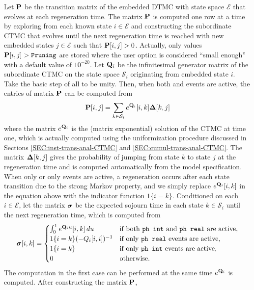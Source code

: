 \begin{private}
Let $\P$ be the transition matrix of the embedded DTMC with state space $\mathcal{E}$
that evolves at each regeneration time.
The matrix $\P$ is computed one row at a time by exploring from each known state $i\in\mathcal{E}$
and constructing the subordinate CTMC that evolves until the next regeneration time is reached
with new embedded states $j\in\mathcal{E}$ such that $\P[i, j]>0$.
Actually, only values $\P[i, j] > \Code{Pruning}$ are stored where the
user option  is
considered ``small enough'' with a default value of $10^{-20}$.
Let $\Q_i$ be the infinitesimal generator matrix of the subordinate CTMC on the state space
$\mathcal{S}_i$ originating from embedded state $i$.  Take the basic step of all 
to be unity.  Then, when both  and  events are active,
the entries of matrix $\P$ can be computed from
\[
  \P[i, j] = \sum_{k\in\mathcal{S}_i} e^{\Q_i}[i, k] \matr{\Delta}[k, j]
\]
where the matrix $e^{\Q_i}$ is the (matrix exponential) solution of the CTMC at time one,
which is actually computed using the uniformization
procedure discussed in Sections \ref{SEC:inst-trans-anal-CTMC} and \ref{SEC:cumul-trans-anal-CTMC}.
The matrix $\matr{\Delta}[k, j]$ gives the probability of jumping from state $k$ to state $j$
at the regeneration time and is computed automatically from the model specification.
When only  or only  events are active,
a regeneration occurs after each state transition due to the strong Markov property, and we
simply replace $e^{\Q_i}[i, k]$ in the equation above with the indicator function $1\{i=k\}$.
Conditioned on each $i\in\mathcal{E}$, let the matrix $\gvect{\sigma}$ be the expected sojourn time
in each state $k\in\mathcal{S}_i$ until the next regeneration time, which is computed from
\[
  \gvect{\sigma}[i, k] =
  \begin{cases}
    \int_{0}^{1} e^{\Q_i u}[i, k]\,du
                               & \mbox{if both \Code{ph int} and \Code{ph real} are active}, \\
    1\{i=k\} (-Q_i[i, i])^{-1} & \mbox{if only \Code{ph real} events are active}, \\
    1\{i=k\}                   & \mbox{if only \Code{ph int} events are active},  \\
    0                          & \mbox{otherwise}.
  \end{cases}
\]
The computation in the first case can be performed at the same time $e^{\Q_i}$ is computed.
After constructing the matrix $\P$,

\end{private}
